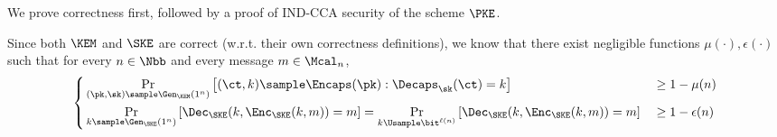 \begin{answer}
    We prove correctness first, followed by a proof of IND-CCA security of the scheme $\PKE$.   

    Since both $\KEM$ and $\SKE$ are correct (w.r.t. their own correctness definitions), we know that there exist negligible functions $\mu(\cdot), \epsilon(\cdot)$ such that for every $n\in\Nbb$ and every message $m\in\Mcal_n$,
    \begin{equation}\label{eq:p4-1}
        \left\{
        \begin{aligned} 
            &\Pr_{(\pk, \sk)\sample \Gen_\KEM(1^n)}\left[(\ct, k)\sample \Encaps(\pk): \Decaps_\sk(\ct)=k \right] && \ge 1-\mu(n)\\
            &\Pr_{k\sample\Gen_\SKE(1^n)}\left[\Dec_\SKE(k, \Enc_\SKE(k, m))=m \right]
            = \Pr_{k\Usample\bit^{\ell(n)}}\left[\Dec_\SKE(k, \Enc_\SKE(k, m))=m \right]&& \ge 1-\epsilon(n)
        \end{aligned}
        \right.
    \end{equation}


\end{answer}

